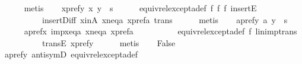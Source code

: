 \begin{isabellebody}
\ \ \ \ \isamarkupfalse%
\ metis\isanewline
\ \ \isamarkupfalse%
\ x{\isacharunderscore}{\kern0pt}pref{\isacharunderscore}{\kern0pt}y{\isacharunderscore}{\kern0pt}{}{\isacharcolon}{\kern0pt}\ {\isachardoublequoteopen}{\isacharparenleft}{\kern0pt}x{\isacharcomma}{\kern0pt}\ y{\isacharparenright}{\kern0pt}\ {\isasymin}\ s{\isachardoublequoteclose}\isanewline
\ \ \ \ \isamarkupfalse%
\ equiv{\isacharunderscore}{\kern0pt}rel{\isacharunderscore}{\kern0pt}except{\isacharunderscore}{\kern0pt}a{\isacharunderscore}{\kern0pt}def\ f{}{\isacharunderscore}{\kern0pt}{}\ f{}\ f{}{\isacharunderscore}{\kern0pt}{}\ insertE\isanewline
\ \ \ \ \ \ \ \ \ \ insert{\isacharunderscore}{\kern0pt}Diff\ x{\isacharunderscore}{\kern0pt}in{\isacharunderscore}{\kern0pt}A\ x{\isacharunderscore}{\kern0pt}neq{\isacharunderscore}{\kern0pt}a\ x{\isacharunderscore}{\kern0pt}pref{\isacharunderscore}{\kern0pt}a{\isacharunderscore}{\kern0pt}{}\ trans\isanewline
\ \ \ \ \isamarkupfalse%
\ metis\isanewline
\ \ \isamarkupfalse%
\ a{\isacharunderscore}{\kern0pt}pref{\isacharunderscore}{\kern0pt}y{\isacharunderscore}{\kern0pt}{}{\isacharcolon}{\kern0pt}\ {\isachardoublequoteopen}{\isacharparenleft}{\kern0pt}a{\isacharcomma}{\kern0pt}\ y{\isacharparenright}{\kern0pt}\ {\isasymin}\ s{\isachardoublequoteclose}\isanewline
\ \ \ \ \isamarkupfalse%
\ a{\isacharunderscore}{\kern0pt}pref{\isacharunderscore}{\kern0pt}x{\isacharunderscore}{\kern0pt}{}\ imp{\isacharunderscore}{\kern0pt}x{\isacharunderscore}{\kern0pt}eq{\isacharunderscore}{\kern0pt}a{\isacharunderscore}{\kern0pt}{}\ x{\isacharunderscore}{\kern0pt}neq{\isacharunderscore}{\kern0pt}a\ x{\isacharunderscore}{\kern0pt}pref{\isacharunderscore}{\kern0pt}a{\isacharunderscore}{\kern0pt}{}\isanewline
\ \ \ \ \ \ \ \ \ \ equiv{\isacharunderscore}{\kern0pt}rel{\isacharunderscore}{\kern0pt}except{\isacharunderscore}{\kern0pt}a{\isacharunderscore}{\kern0pt}def\ f{}\ lin{\isacharunderscore}{\kern0pt}imp{\isacharunderscore}{\kern0pt}trans\isanewline
\ \ \ \ \ \ \ \ \ \ transE\ x{\isacharunderscore}{\kern0pt}pref{\isacharunderscore}{\kern0pt}y{\isacharunderscore}{\kern0pt}{}\isanewline
\ \ \ \ \isamarkupfalse%
\ metis\isanewline
\ \ \isamarkupfalse%
\ {\isachardoublequoteopen}False{\isachardoublequoteclose}\isanewline
\ \ \ \ \isamarkupfalse%
\ a{\isacharunderscore}{\kern0pt}pref{\isacharunderscore}{\kern0pt}y{\isacharunderscore}{\kern0pt}{}\ antisymD\ equiv{\isacharunderscore}{\kern0pt}rel{\isacharunderscore}{\kern0pt}except{\isacharunderscore}{\kern0pt}a{\isacharunderscore}{\kern0pt}def\isanewline

\end{isabellebody}
